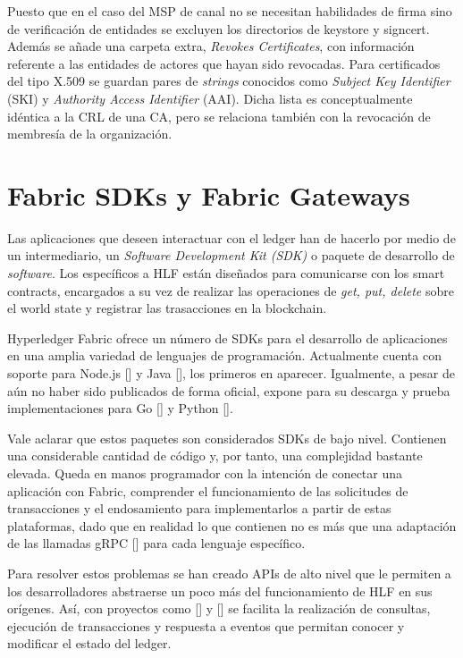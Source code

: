 Puesto que en el caso del MSP de canal no se necesitan habilidades de firma sino de verificaci\'on de entidades se excluyen los directorios de keystore y signcert. Adem\'as se a\~nade una carpeta extra, \emph{Revokes Certificates}, con informaci\'on referente a las entidades de actores que hayan sido revocadas. Para certificados del tipo X.509 se guardan pares de \emph{strings} conocidos como \emph{Subject Key Identifier} (SKI) y \emph{Authority Access Identifier} (AAI). Dicha lista es conceptualmente id\'entica a la CRL de una CA, pero se relaciona tambi\'en con la revocaci\'on de membres\'ia de la organizaci\'on.


\section{Fabric SDKs y Fabric Gateways} 

Las aplicaciones que deseen interactuar con el ledger han de hacerlo por medio de un intermediario, un \emph{Software Development Kit (SDK)} o paquete de desarrollo de \emph{software}. Los espec\'ificos a HLF est\'an dise\~nados para comunicarse con los smart contracts, encargados a su vez de realizar las operaciones de \emph{get, put, delete} sobre el world state y registrar las trasacciones en la blockchain.%

Hyperledger Fabric ofrece un n\'umero de SDKs para el desarrollo de aplicaciones en una amplia variedad de lenguajes de programaci\'on. Actualmente cuenta con soporte para Node.js [\cite{sdknode}] y Java [\cite{sdkjava}], los primeros en aparecer. Igualmente, a pesar de a\'un no haber sido publicados de forma oficial, expone para su descarga y prueba implementaciones para Go [\cite{sdkgo}] y Python [\cite{sdkpython}].

Vale aclarar que estos paquetes son considerados SDKs de bajo nivel. Contienen una considerable cantidad de c\'odigo y, por tanto, una complejidad bastante elevada. Queda en manos programador con la intenci\'on de conectar una aplicaci\'on con Fabric, comprender el funcionamiento de las solicitudes de transacciones y el endosamiento para implementarlos a partir de estas plataformas, dado que en realidad lo que contienen no es m\'as que una adaptaci\'on de las llamadas gRPC [\cite{grpc}] para cada lenguaje espec\'ifico.

Para resolver estos problemas se han creado APIs de alto nivel que le permiten a los desarrolladores abstraerse un poco m\'as del funcionamiento de HLF en sus or\'igenes. As\'i, con proyectos como [\cite{fabricgatewayjava}] y [\cite{fabricgateway}] se facilita la realizaci\'on de consultas, ejecuci\'on de transacciones y respuesta a eventos que permitan conocer y modificar el estado del ledger.

